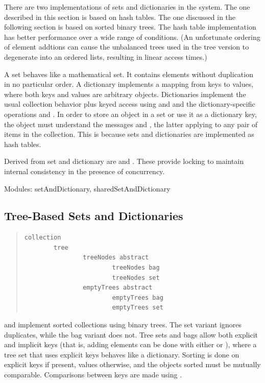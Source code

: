 \documentclass[letterpaper,10pt,english]{sphinxmanual}
\begin{document}
There are two implementations of sets and dictionaries in the system. The one described in this
section is based on hash tables. The one discussed in the following section is based on sorted binary
trees. The hash table implementation has better performance over a wide range of conditions.
(An unfortunate ordering of element addtions can cause the unbalanced trees used in the tree version
to degenerate into an ordered lists, resulting in linear access times.)

A set behaves like a mathematical set. It contains elements without duplication in no particular order.
A dictionary implements a mapping from keys to values, where both keys and values are arbitrary
objects. Dictionaries implement the usual collection behavior plus keyed access using 
and  and the dictionary-specific operations  and . In order
to store an object in a set or use it as a dictionary key, the object must understand the messages
 and \code{=}, the latter applying to any pair of items in the collection. This is because sets and dictionaries
are implemented as hash tables.

Derived from set and dictionary are  and . These provide locking
to maintain internal consistency in the presence of concurrency.

Modules: setAndDictionary, sharedSetAndDictionary


\subsection{Tree-Based Sets and Dictionaries}
\label{collections:tree-based-sets-and-dictionaries}\begin{quote}

\begin{Verbatim}[commandchars=\\\{\}]
collection
        tree
                treeNodes abstract
                        treeNodes bag
                        treeNodes set
                emptyTrees abstract
                        emptyTrees bag
                        emptyTrees set
\end{Verbatim}
\end{quote}

 and  implement sorted collections using binary trees. The set variant ignores
duplicates, while the bag variant does not. Tree sets and bags allow both explicit and implicit keys
(that is, adding elements can be done with either  or ), where a tree set that uses
explicit keys behaves like a dictionary. Sorting is done on explicit keys if present, values otherwise,
and the objects sorted must be mutually comparable. Comparisons between keys are made using
.
\end{document}
